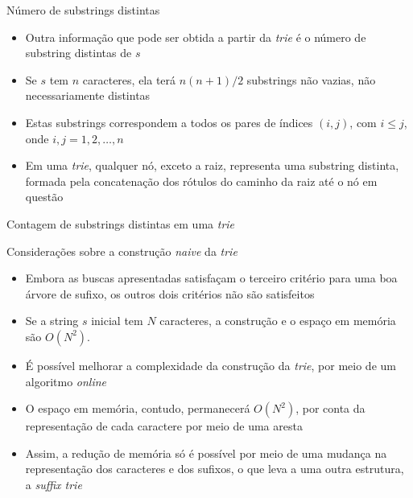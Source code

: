 \begin{frame}[fragile]{Número de substrings distintas}

    \begin{itemize}
        \item Outra informação que pode ser obtida a partir da \textit{trie} é o número de 
            substring distintas de $s$
        \pause

        \item Se $s$ tem $n$ caracteres, ela terá $n(n + 1)/2$ substrings não vazias, não 
            necessariamente distintas
        \pause

        \item Estas substrings correspondem a todos os pares de índices $(i, j)$, com 
            $i \leq j$, onde $i, j = 1, 2, \ldots, n$
        \pause

        \item Em uma \textit{trie}, qualquer nó, exceto a raiz, representa uma substring 
            distinta, formada pela concatenação dos rótulos do caminho da raiz até o nó em
            questão
    \end{itemize}

\end{frame}

\begin{frame}[fragile]{Contagem de substrings distintas em uma {\it trie}}
\end{frame}

\begin{frame}[fragile]{Considerações sobre a construção {\it naive} da {\it trie}}

    \begin{itemize}
        \item Embora as buscas apresentadas satisfaçam o terceiro critério para uma boa árvore de 
            sufixo, os outros dois critérios não são satisfeitos
        \pause

        \item Se a string $s$ inicial tem $N$ caracteres, a construção e o espaço em memória são 
            $O(N^2)$.
        \pause

        \item É possível melhorar a complexidade da construção da {\it trie}, por meio de um
            algoritmo \textit{online}
        \pause

        \item O espaço em memória, contudo, permanecerá $O(N^2)$, por conta da representação de
            cada caractere por meio de uma aresta
        \pause

        \item Assim, a redução de memória só é possível por meio de uma mudança na representação
            dos caracteres e dos sufixos, o que leva a uma outra estrutura, a \textit{suffix trie}
    \end{itemize}

\end{frame}
